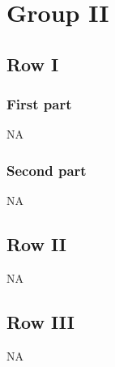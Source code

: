 \documentclass[9pt]{article}
\numberwithin{equation}{section}
\begin{document}
\section{Group II}
\subsection{Row I}
\subsubsection{First part}
\textsc{NA}
\subsubsection{Second part}
\textsc{NA}
\subsection{Row II}
\textsc{NA}
\subsection{Row III}
\textsc{NA}
\end{document}
